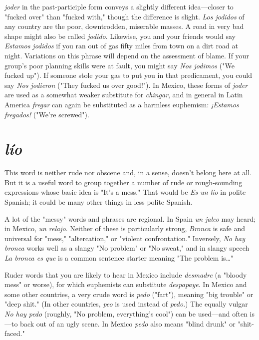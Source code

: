 \emph{joder} in the past-participle form conveys a slightly different
idea---closer to "fucked over" than "fucked with," though the difference is slight. \emph{Los jodidos} of any country are the poor, downtrodden,
miserable masses. A road in very bad shape might also be called \emph{jodido}. Likewise, you and your friends would say \emph{Estamos jodidos} if you
ran out of gas fifty miles from town on a dirt road at night. Variations
on this phrase will depend on the assessment of blame. If your group's
poor planning skills were at fault, you might say \emph{Nos jodimos} ("We
fucked up"). If someone stole your gas to put you in that predicament,
you could say \emph{Nos jodieron} ("They fucked us over good!"). In Mexico,
these forms of \emph{joder} are used as a somewhat weaker substitute for
\emph{chingar}, and in general in Latin America \emph{fregar} can again be substituted as a harmless euphemism: \emph{¡Estamos fregados!} ("We're screwed").

\section{\emph{lío}}

This word is neither rude nor obscene and, in a sense, doesn't
belong here at all. But it is a useful word to group together a number of
rude or rough-sounding expressions whose basic idea is "It's a mess."
That would be \emph{Es un lío} in polite Spanish; it could be many other
things in less polite Spanish.

A lot of the "messy" words and phrases are regional. In Spain
\emph{un jaleo} may heard; in Mexico, \emph{un relajo}. Neither of these is particularly strong, \emph{Bronca} is safe and universal for "mess," "altercation,"
or "violent confrontation." Inversely, \emph{No hay bronca} works well as a
slangy "No problem" or "No sweat," and in slangy speech \emph{La bronca
es que} is a common sentence starter meaning "The problem is\ldots{}"

Ruder words that you are likely to hear in Mexico include \emph{desmadre} (a "bloody mess" or worse), for which euphemists can substitute \emph{despapaye}. In Mexico and some other countries, a very crude
word is \emph{pedo} ("fart"), meaning "big trouble" or "deep shit." (In other
countries, \emph{peo} is used instead of \emph{pedo}.) The equally vulgar \emph{No hay
pedo} (roughly, "No problem, everything's cool") can be used---and
often is---to back out of an ugly scene. In Mexico \emph{pedo} also means
"blind drunk" or "shit-faced."

